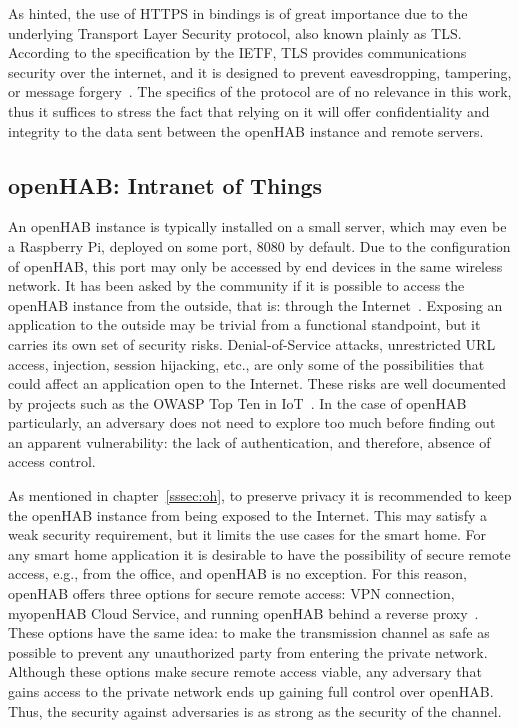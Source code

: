 \documentclass[12pt]{article}
\begin{document}
As hinted, the use of HTTPS in bindings is of great importance due to the underlying Transport Layer Security protocol, also known plainly as TLS. According to the specification by the IETF, TLS provides communications security over the internet, and it is designed to prevent eavesdropping, tampering, or message forgery~\cite{RFC5246}. The specifics of the protocol are of no relevance in this work, thus it suffices to stress the fact that relying on it will offer confidentiality and integrity to the data sent between the openHAB instance and remote servers.

\subsection{openHAB: Intranet of Things}

An openHAB instance is typically installed on a small server, which may even be a Raspberry Pi, deployed on some port, 8080 by default. Due to the configuration of openHAB, this port may only be accessed by end devices in the same wireless network. It has been asked by the community if it is possible to access the openHAB instance from the outside, that is: through the Internet~\cite{openhab_05}. Exposing an application to the outside may be trivial from a functional standpoint, but it carries its own set of security risks. Denial-of-Service attacks, unrestricted URL access, injection, session hijacking, etc., are only some of the possibilities that could affect an application open to the Internet. These risks are well documented by projects such as the OWASP Top Ten in IoT~\cite{owasp}. In the case of openHAB particularly, an adversary does not need to explore too much before finding out an apparent vulnerability: the lack of authentication, and therefore, absence of access control.

As mentioned in chapter~\ref{sssec:oh}, to preserve privacy it is recommended to keep the openHAB instance from being exposed to the Internet. This may satisfy a weak security requirement, but it limits the use cases for the smart home. For any smart home application it is desirable to have the possibility of secure remote access, e.g., from the office, and openHAB is no exception. For this reason, openHAB offers three options for secure remote access: VPN connection, myopenHAB Cloud Service, and running openHAB behind a reverse proxy~\cite{openhab_04}. These options have the same idea: to make the transmission channel as safe as possible to prevent any unauthorized party from entering the private network. Although these options make secure remote access viable, any adversary that gains access to the private network ends up gaining full control over openHAB. Thus, the security against adversaries is as strong as the security of the channel.
\end{document}
